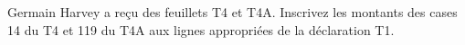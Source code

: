 Germain Harvey a reçu des feuillets T4 et T4A. Inscrivez les montants des cases 14 du T4 et 119 du T4A aux lignes appropriées de la déclaration T1.